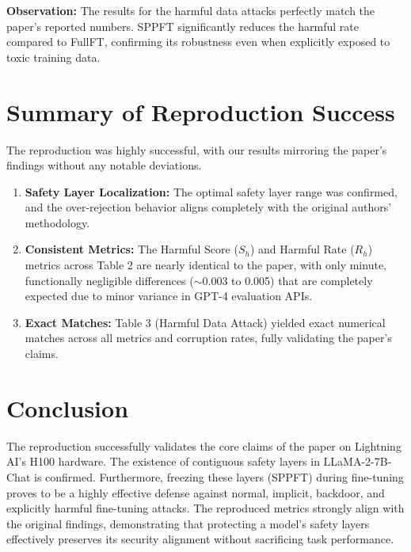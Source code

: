 \documentclass[11pt,a4paper]{article}
\begin{document}
\noindent\textbf{Observation:} The results for the harmful data attacks perfectly match the paper's reported numbers. SPPFT significantly reduces the harmful rate compared to FullFT, confirming its robustness even when explicitly exposed to toxic training data.

\section{Summary of Reproduction Success}

The reproduction was highly successful, with our results mirroring the paper's findings without any notable deviations.
\begin{enumerate}
    \item \textbf{Safety Layer Localization:} The optimal safety layer range was confirmed, and the over-rejection behavior aligns completely with the original authors' methodology.
    \item \textbf{Consistent Metrics:} The Harmful Score ($S_h$) and Harmful Rate ($R_h$) metrics across Table 2 are nearly identical to the paper, with only minute, functionally negligible differences ($\sim$0.003 to 0.005) that are completely expected due to minor variance in GPT-4 evaluation APIs.
    \item \textbf{Exact Matches:} Table 3 (Harmful Data Attack) yielded exact numerical matches across all metrics and corruption rates, fully validating the paper's claims.
\end{enumerate}

\section{Conclusion}

The reproduction successfully validates the core claims of the paper on Lightning AI's H100 hardware. The existence of contiguous safety layers in LLaMA-2-7B-Chat is confirmed. Furthermore, freezing these layers (SPPFT) during fine-tuning proves to be a highly effective defense against normal, implicit, backdoor, and explicitly harmful fine-tuning attacks. The reproduced metrics strongly align with the original findings, demonstrating that protecting a model's safety layers effectively preserves its security alignment without sacrificing task performance.
\end{document}
